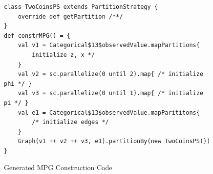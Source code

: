 \begin{figure}[h]
\begin{lstlisting}
class TwoCoinsPS extends PartitionStrategy {
	override def getPartition /**/
}
def constrMPG() = {
	val v1 = Categorical$13$observedValue.mapPartitions{
		initialize z, x */
	}
	val v2 = sc.parallelize(0 until 2).map{ /* initialize phi */ }
	val v3 = sc.parallelize(0 until 1).map{ /* initialize pi */ }
	val e1 = Categorical$13$observedValue.mapParititons{
		/* initialize edges */
	}
	Graph(v1 ++ v2 ++ v3, e1).partitionBy(new TwoCoinsPS())
}
\end{lstlisting}
\caption{Generated MPG Construction Code}
\label{fig:two_coins_mpg_constr_code}
\end{figure}
%

